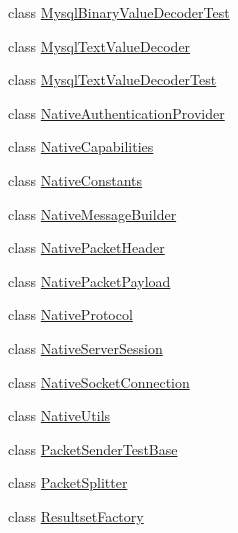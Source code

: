 \begin{DoxyCompactItemize}
\item 
class \mbox{\hyperlink{classcom_1_1mysql_1_1cj_1_1protocol_1_1a_1_1_mysql_binary_value_decoder_test}{Mysql\+Binary\+Value\+Decoder\+Test}}
\item 
class \mbox{\hyperlink{classcom_1_1mysql_1_1cj_1_1protocol_1_1a_1_1_mysql_text_value_decoder}{Mysql\+Text\+Value\+Decoder}}
\item 
class \mbox{\hyperlink{classcom_1_1mysql_1_1cj_1_1protocol_1_1a_1_1_mysql_text_value_decoder_test}{Mysql\+Text\+Value\+Decoder\+Test}}
\item 
class \mbox{\hyperlink{classcom_1_1mysql_1_1cj_1_1protocol_1_1a_1_1_native_authentication_provider}{Native\+Authentication\+Provider}}
\item 
class \mbox{\hyperlink{classcom_1_1mysql_1_1cj_1_1protocol_1_1a_1_1_native_capabilities}{Native\+Capabilities}}
\item 
class \mbox{\hyperlink{classcom_1_1mysql_1_1cj_1_1protocol_1_1a_1_1_native_constants}{Native\+Constants}}
\item 
class \mbox{\hyperlink{classcom_1_1mysql_1_1cj_1_1protocol_1_1a_1_1_native_message_builder}{Native\+Message\+Builder}}
\item 
class \mbox{\hyperlink{classcom_1_1mysql_1_1cj_1_1protocol_1_1a_1_1_native_packet_header}{Native\+Packet\+Header}}
\item 
class \mbox{\hyperlink{classcom_1_1mysql_1_1cj_1_1protocol_1_1a_1_1_native_packet_payload}{Native\+Packet\+Payload}}
\item 
class \mbox{\hyperlink{classcom_1_1mysql_1_1cj_1_1protocol_1_1a_1_1_native_protocol}{Native\+Protocol}}
\item 
class \mbox{\hyperlink{classcom_1_1mysql_1_1cj_1_1protocol_1_1a_1_1_native_server_session}{Native\+Server\+Session}}
\item 
class \mbox{\hyperlink{classcom_1_1mysql_1_1cj_1_1protocol_1_1a_1_1_native_socket_connection}{Native\+Socket\+Connection}}
\item 
class \mbox{\hyperlink{classcom_1_1mysql_1_1cj_1_1protocol_1_1a_1_1_native_utils}{Native\+Utils}}
\item 
class \mbox{\hyperlink{classcom_1_1mysql_1_1cj_1_1protocol_1_1a_1_1_packet_sender_test_base}{Packet\+Sender\+Test\+Base}}
\item 
class \mbox{\hyperlink{classcom_1_1mysql_1_1cj_1_1protocol_1_1a_1_1_packet_splitter}{Packet\+Splitter}}
\item 
class \mbox{\hyperlink{classcom_1_1mysql_1_1cj_1_1protocol_1_1a_1_1_resultset_factory}{Resultset\+Factory}}

\end{DoxyCompactItemize}
